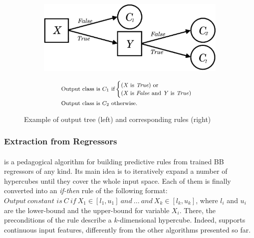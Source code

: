 \documentclass[12pt,a4paper,openright,twoside]{book}
\begin{document}
\begin{figure}
    \centering
    \begin{subfigure}{0.4\textwidth}
        \includegraphics[width=\linewidth]{figures/tree.pdf}
    \end{subfigure}
    \hfill
    \vrule
    \hfill
    \begin{subfigure}{0.45\textwidth}
        \begin{align*}\footnotesize
            \begin{split}
                \text{Output} ~ & \text{class is} ~ C_1 ~ \text{if}
                \begin{cases}
                    ( \mathit{X} ~ \text{is \textit{True}} ) ~ \text{or}
                    \\
                    ( \mathit{X} ~ \text{is \textit{False} and} ~ \mathit{Y} \text{ is \textit{True}} )
                \end{cases}
                \\
                \text{Output} ~ & \text{class is} ~ C_2 ~ \text{otherwise.}
            \end{split}
        \end{align*}
    \end{subfigure}
    \caption{Example of \trepan{} output tree (left) and corresponding rules (right)}
    \label{fig:trepanTree}
\end{figure}

\subsubsection{Extraction from Regressors}\label{ssec:regressors}

\paragraph{\iter}\label{par:iter}

\iter{} \cite{HuysmansBV2006} is a pedagogical algorithm for building predictive rules from trained BB regressors of any kind.
%
Its main idea is to iteratively expand a number of hypercubes until they cover the whole input space.
%
Each of them is finally converted into an \emph{if-then} rule of the following format:
$\textit{Output} ~ \textit{constant is} ~ C ~ \textit{if} ~ X_1 \in [l_1, \mathit{u_1}]
~\textit{and} ~ ... ~ \textit{and} ~ \mathit{X_k} \in [\mathit{l_k}, \mathit{u_k}]$,
%
where $l_i$ and $u_i$ are the lower-bound and the upper-bound for variable $X_i$.
%
There, the preconditions of the rule describe a $k$-dimensional hypercube.
%
Indeed, \iter{} supports continuous input features, differently from the other algorithms presented so far.
\end{document}
